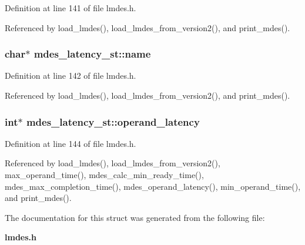 Definition at line 141 of file lmdes.h.

Referenced by load\_\-lmdes(), load\_\-lmdes\_\-from\_\-version2(), and print\_\-mdes().
\subsubsection{\setlength{\rightskip}{0pt plus 5cm}char$\ast$ \bf{mdes\_\-latency\_\-st::name}}\label{structmdes__latency__st_052697dc522f0aeb9ea1455f131df692}




Definition at line 142 of file lmdes.h.

Referenced by load\_\-lmdes(), load\_\-lmdes\_\-from\_\-version2(), and print\_\-mdes().
\subsubsection{\setlength{\rightskip}{0pt plus 5cm}int$\ast$ \bf{mdes\_\-latency\_\-st::operand\_\-latency}}\label{structmdes__latency__st_2001567fdd18018d2e7e7c3b88243113}




Definition at line 144 of file lmdes.h.

Referenced by load\_\-lmdes(), load\_\-lmdes\_\-from\_\-version2(), max\_\-operand\_\-time(), mdes\_\-calc\_\-min\_\-ready\_\-time(), mdes\_\-max\_\-completion\_\-time(), mdes\_\-operand\_\-latency(), min\_\-operand\_\-time(), and print\_\-mdes().

The documentation for this struct was generated from the following file:\begin{CompactItemize}
\item 
\bf{lmdes.h}\end{CompactItemize}
